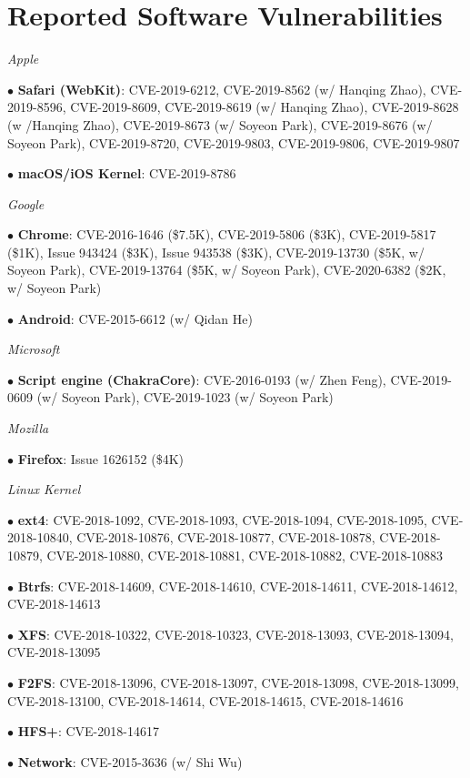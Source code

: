 \clearpage

\section*{Reported Software Vulnerabilities}
\begin{description}
\item {\emph{Apple}}
\item $\bullet$ \textbf{Safari (WebKit)}: 
	CVE-2019-6212,
	CVE-2019-8562 (w/ Hanqing Zhao), 
	CVE-2019-8596, 
	CVE-2019-8609,
	CVE-2019-8619 (w/ Hanqing Zhao), 
	CVE-2019-8628 (w /Hanqing Zhao), 
	CVE-2019-8673 (w/ Soyeon Park), 
	CVE-2019-8676 (w/ Soyeon Park), 
	CVE-2019-8720,
	CVE-2019-9803,
	CVE-2019-9806,
	CVE-2019-9807

\item $\bullet$ \textbf{macOS/iOS Kernel}: CVE-2019-8786

\item {\emph{Google}}
\item $\bullet$ \textbf{Chrome}: 
	CVE-2016-1646 (\$7.5K),
	CVE-2019-5806 (\$3K), 
	CVE-2019-5817 (\$1K), 
	Issue 943424 (\$3K), 
	Issue 943538 (\$3K), 
	CVE-2019-13730 (\$5K, w/ Soyeon Park), 
	CVE-2019-13764 (\$5K, w/ Soyeon Park), 
	CVE-2020-6382 (\$2K, w/ Soyeon Park)

\item $\bullet$ \textbf{Android}: CVE-2015-6612 (w/ Qidan He)

\item {\emph{Microsoft}}
	\item $\bullet$ \textbf{Script engine (ChakraCore)}: 
		CVE-2016-0193 (w/ Zhen Feng), 
		CVE-2019-0609 (w/ Soyeon Park), 
		CVE-2019-1023 (w/ Soyeon Park)

\item {\emph{Mozilla}}
	\item $\bullet$ \textbf{Firefox}:
		Issue 1626152 (\$4K)

\item {\emph{Linux Kernel}}
    \item $\bullet$ \textbf{ext4}: 
    	CVE-2018-1092,
    	CVE-2018-1093,
    	CVE-2018-1094,
    	CVE-2018-1095,
    	CVE-2018-10840,
    	CVE-2018-10876,
    	CVE-2018-10877,
    	CVE-2018-10878,
    	CVE-2018-10879,
    	CVE-2018-10880,
    	CVE-2018-10881,
    	CVE-2018-10882,
    	CVE-2018-10883
    \item $\bullet$ \textbf{Btrfs}: 
    	CVE-2018-14609,
    	CVE-2018-14610,
    	CVE-2018-14611,
    	CVE-2018-14612,
    	CVE-2018-14613
    \item $\bullet$ \textbf{XFS}: 
        CVE-2018-10322,
    	CVE-2018-10323,
    	CVE-2018-13093,
    	CVE-2018-13094,
    	CVE-2018-13095
    \item $\bullet$ \textbf{F2FS}: 
    	CVE-2018-13096,
    	CVE-2018-13097,
    	CVE-2018-13098,
    	CVE-2018-13099,
    	CVE-2018-13100,
    	CVE-2018-14614,
    	CVE-2018-14615,
    	CVE-2018-14616
	\item $\bullet$ \textbf{HFS+}: CVE-2018-14617
	\item $\bullet$ \textbf{Network}: CVE-2015-3636 (w/ Shi Wu)


\end{description}
